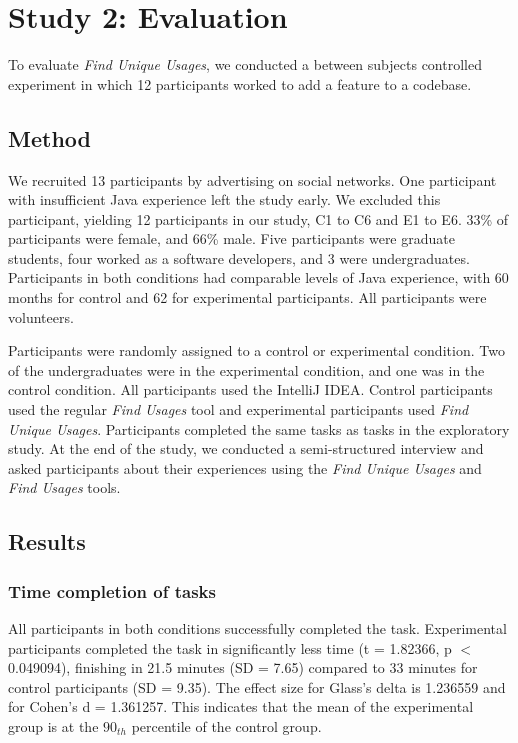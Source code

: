 \documentclass[conference]{IEEEtran}
\begin{document}
\section{Study 2: Evaluation}
To evaluate \textit{Find Unique Usages}, we conducted a between subjects controlled experiment in which 12 participants worked to add a feature to a codebase. 
\subsection{Method}
We recruited 13 participants by advertising on social networks. One participant with insufficient Java experience left the study early. We excluded this participant, yielding 12 participants in our study, C1 to C6 and E1 to E6. 
33\% of participants were female, and 66\% male. Five participants were graduate students, four worked as a software developers, and 3 were undergraduates. Participants in both conditions had comparable levels of Java experience, with 60 months for control and 62 for experimental participants. All participants were volunteers.\par

Participants were randomly assigned to a control  or experimental condition. Two of the undergraduates were in the experimental condition, and one was in the control condition.  All participants used the IntelliJ IDEA. Control participants used the regular \textit{Find Usages} tool and experimental participants used \textit{Find Unique Usages}.
Participants completed the same tasks as tasks in the exploratory study.
At the end of the study, we conducted a semi-structured interview and asked participants about their experiences using the \textit{Find Unique Usages} and \textit{Find Usages} tools.


\subsection{Results}
\subsubsection{Time completion of tasks}
All participants in both conditions successfully completed the task. Experimental participants completed the task in significantly less time (t = 1.82366, p $<$ 0.049094), finishing in 21.5 minutes (SD = 7.65) compared to 33 minutes for control participants (SD = 9.35). The effect size for Glass's delta is 1.236559 and for Cohen's d =  1.361257. This indicates that the mean of the experimental group is at the $90_{th}$ percentile of the control group.  
\end{document}
